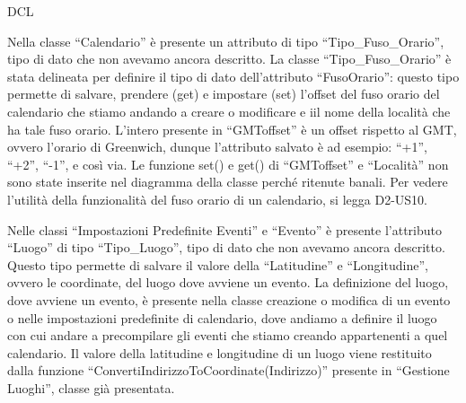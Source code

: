 \begin{listaPersonale}{DCL}
    
        \begin{center}
            
        \end{center}
    
        



    Nella classe “Calendario” è presente un attributo di tipo “Tipo\_Fuso\_Orario”, tipo di dato che non avevamo ancora descritto. La classe “Tipo\_Fuso\_Orario” è stata delineata per definire il tipo di dato dell'attributo “FusoOrario”: questo tipo permette di salvare, prendere (get) e impostare (set) l'offset del fuso orario del calendario che stiamo andando a creare o modificare e iil nome della località che ha tale fuso orario. L'intero presente in “GMToffset” è un offset rispetto al GMT, ovvero l'orario di Greenwich, dunque l'attributo salvato è ad esempio: “+1”, “+2”, “-1”, e così via. Le funzione set() e get() di “GMToffset” e “Località” non sono state inserite nel diagramma della classe perché ritenute banali. Per vedere l'utilità della funzionalità del fuso orario di un calendario, si legga D2-US10.
    
    
        \begin{center}
            
        \end{center}
    
        


    Nelle classi “Impostazioni Predefinite Eventi” e “Evento” è presente l'attributo “Luogo” di tipo “Tipo\_Luogo”, tipo di dato che non avevamo ancora descritto. Questo tipo permette di salvare il valore della “Latitudine” e “Longitudine”, ovvero le coordinate, del luogo dove avviene un evento. La definizione del luogo, dove avviene un evento, è presente nella classe creazione o modifica di un evento o nelle impostazioni predefinite di calendario, dove andiamo a definire il luogo con cui andare a precompilare gli eventi che stiamo creando appartenenti a quel calendario. Il valore della latitudine e longitudine di un luogo viene restituito dalla funzione “ConvertiIndirizzoToCoordinate(Indirizzo)” presente in “Gestione Luoghi”, classe già presentata.
    

\end{listaPersonale}
